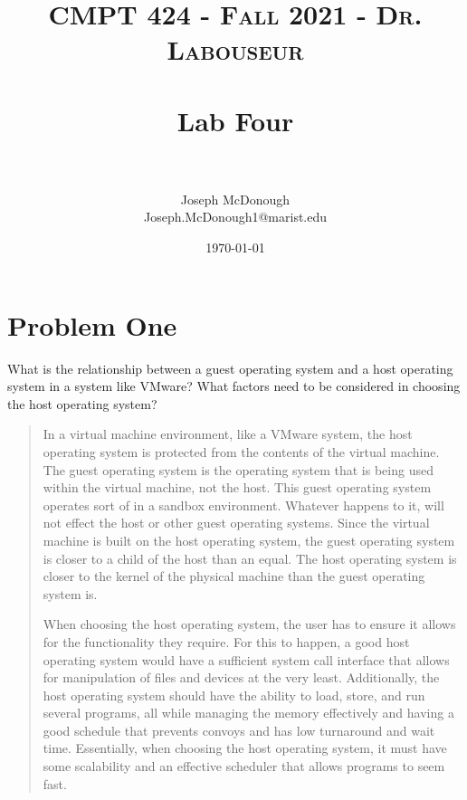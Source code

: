\documentclass[letterpaper, 10pt,DIV=13]{scrartcl}
\title{	
   \normalfont \normalsize 
   \textsc{CMPT 424 - Fall 2021 - Dr. Labouseur} \\[10pt] %
   \horrule{0.5pt} \\[0.25cm] 	%
   \huge Lab Four  \\     	    %
   \horrule{0.5pt} \\[0.25cm] 	%
}
\author{Joseph McDonough \\ \normalsize Joseph.McDonough1@marist.edu}
\date{\normalsize\today} 	%
\numberwithin{equation}{section} %
\numberwithin{figure}{section} %
\numberwithin{table}{section} %
\begin{document}
\maketitle %

\section{Problem One}

What	is	the	relationship	between	a	guest	operating	system	and	a	host	operating	
system	in	a	system	like	VMware?	What	factors	need	to	be	considered	in	choosing	the	
host	operating	system?

\begin{quote}

    In a virtual machine environment, like a VMware system, the host operating system is protected from the contents of the virtual machine. The guest operating system is the operating system that is being used within the virtual machine, not the host. This guest operating system operates sort of in a sandbox environment. Whatever happens to it, will not effect the host or other guest operating systems. Since the virtual machine is built on the host operating system, the guest operating system is closer to a child of the host than an equal. The host operating system is closer to the kernel of the physical machine than the guest operating system is. 
    
    When choosing the host operating system, the user has to ensure it allows for the functionality they require. For this to happen, a good host operating system would have a sufficient system call interface that allows for manipulation of files and devices at the very least. Additionally, the host operating system should have the ability to load, store, and run several programs, all while managing the memory effectively and having a good schedule that prevents convoys and has low turnaround and wait time. Essentially, when choosing the host operating system, it must have some scalability and an effective scheduler that allows programs to seem fast.  
\end{quote}
\end{document}
